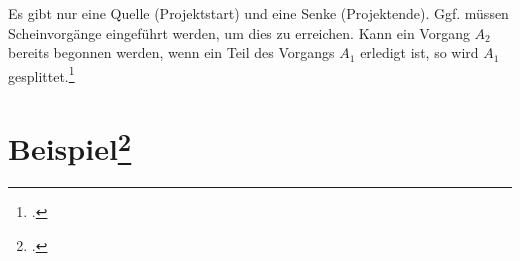 \documentclass{lehramt-informatik-haupt}
\begin{document}
\noindent
Es gibt nur eine Quelle (Projektstart) und eine Senke (Projektende).
Ggf. müssen Scheinvorgänge eingeführt werden, um dies zu erreichen.
%
Kann ein Vorgang $A_2$ bereits begonnen werden, wenn ein Teil des
Vorgangs $A_1$ erledigt ist, so wird $A_1$ gesplittet.\footcite[Seite
27]{sosy:fs:3}

\section{Beispiel\footcite[Seite 16 - 21]{sosy:fs:3}}

\begin{center}
\end{center}
\end{document}
